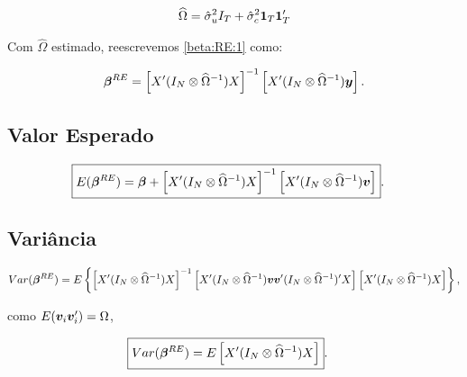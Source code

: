 \documentclass[11pt,oneside,a4paper]{article}
\numberwithin{equation}{section}
\begin{document}
\vspace{-1 em}
\begin{align*}
\widehat{\Omega}
= 
\hat{\sigma}^{2}_{u} I_{T} + \hat{\sigma}_{c}^{2} \boldsymbol{1}_{T} \boldsymbol{1}_{T}'
\end{align*}

Com $\widehat{\Omega}$ estimado, reescrevemos \eqref{beta:RE:1} como:

\vspace{-1 em}
\begin{align} \label{beta:RE:2}
\boldsymbol{\beta}^{RE} = 
\left[ X' (I_{N} \otimes \widehat{\Omega}^{-1}) X \right]^{-1}
\left[ X' (I_{N} \otimes \widehat{\Omega}^{-1}) \boldsymbol{y} \right].
\end{align}


\subsection*{Valor Esperado}

\vspace{-1 em}
\begin{align*}
	\Aboxed{
E( \mbs{\beta}^{RE} ) = 
\mbs{\beta} +
\left[ X' (I_{N} \otimes \widehat{\Omega}^{-1}) X \right]^{-1}
\left[ X' (I_{N} \otimes \widehat{\Omega}^{-1}) \mbs{v} \right] }.
\end{align*}

\subsection*{Variância}

\vspace{-1 em}
\begin{align*} 
Var( \boldsymbol{\beta}^{RE} ) = 
E
\left\{ 
\left[ X' ( I_{N} \otimes \widehat{\Omega}^{-1} ) X \right]^{-1}
\left[
X' ( I_{N} \otimes \widehat{\Omega}^{-1} )
\boldsymbol{v} \boldsymbol{v}'
( I_{N} \otimes \widehat{\Omega}^{-1} )' X
\right]
\left[ X' ( I_{N} \otimes \widehat{\Omega}^{-1} ) X \right]
\right\},
\end{align*}

\noindent
como $E( \boldsymbol{v}_{i} \boldsymbol{v}_{i}' ) =\Omega$,

\vspace{-1 em}
\begin{align*} 
	\Aboxed{
Var( \mbs{\beta}^{RE} ) = 
E
\left[ X' ( I_{N} \otimes \widehat{\Omega}^{-1} ) X \right] }.
\end{align*}
\end{document}

